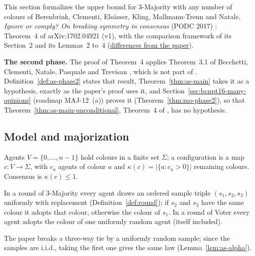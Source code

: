 This section formalizes the upper bound for 3-Majority with any number of colours of
Berenbrink, Clementi, Elsässer, Kling, Mallmann-Trenn and Natale, \emph{Ignore or comply? On
breaking symmetry in consensus} (PODC 2017) \cite{BCEKMN17}: Theorem~4 of arXiv:1702.04921 (v1),
with the comparison framework of its Section~2 and its Lemmas~2 to~4
(\href{https://github.com/formal-dynamics/leanamics/blob/main/3-majority/FORMALIZATION_DIFFERENCES.md#3-majority-from-any-configuration-anystart-roadmap-maj-6-b}{differences
from the paper}).

\textbf{The second phase.} The proof of Theorem~4 applies Theorem~3.1 of Becchetti, Clementi,
Natale, Pasquale and Trevisan \cite{BCNPT16}, which is not part of \cite{BCEKMN17}.
Definition~\ref{def:as-phase2} states that result, Theorem~\ref{thm:as-main} takes it as a
hypothesis, exactly as the paper's proof uses it, and Section~\ref{sec:bcnpt16-many-opinions}
(roadmap MAJ-12~(a)) proves it (Theorem~\ref{thm:mo-phase2}), so that
Theorem~\ref{thm:as-main-unconditional}, Theorem~4 of \cite{BCEKMN17}, has no hypothesis.

\subsection{Model and majorization}

Agents $V=\{0,\dots,n-1\}$ hold colours in a finite set $\Sigma$; a configuration is a map
$c\colon V\to\Sigma$, with $c_a$ agents of colour $a$ and $\kappa(c)=|\{a : c_a>0\}|$ remaining
colours. Consensus is $\kappa(c)\le1$.

\begin{definition}\label{def:as-model}
\leanok
{}
In a round of 3-Majority every agent draws an ordered sample triple $(s_1,s_2,s_3)$ uniformly
with replacement (Definition~\ref{def:round}); if $s_2$ and $s_3$ have the same colour it adopts
that colour, otherwise the colour of $s_1$. In a round of Voter every agent adopts the colour of
one uniformly random agent (itself included).
\end{definition}

The paper breaks a three-way tie by a uniformly random sample; since the samples are i.i.d.,
taking the first one gives the same law (Lemma~\ref{lem:as-alpha}).

